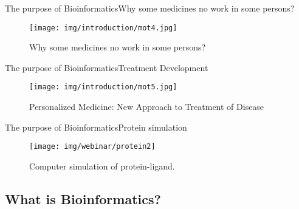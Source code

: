 \documentclass[10pt]{beamer}
\newcommand{\1}{
        	\setbeamertemplate{background}{
        		\texttt{[image: img/1]}
        		\tikz[overlay] \fill[fill opacity=0.75,fill=white] (0,0) rectangle (-\paperwidth,\paperheight);
        	}
}
\begin{document}
\begin{frame}{The purpose of Bioinformatics}{Why some medicines no work in some persons?}
	\begin{figure}[]
		\centering
		\texttt{[image: img/introduction/mot4.jpg]}
		\label{img:mot2}
		\caption{Why some medicines no work in some persons?}
	\end{figure}
\end{frame}

\begin{frame}{The purpose of Bioinformatics}{Treatment Development}
	\begin{figure}[]
		\centering
		\texttt{[image: img/introduction/mot5.jpg]}
		\label{img:mot2}
		\caption{Personalized Medicine: New Approach to Treatment of Disease}
	\end{figure}
\end{frame}

\begin{frame}{The purpose of Bioinformatics}{Protein simulation}
	\begin{figure}[]
		\centering
		\texttt{[image: img/webinar/protein2]}
		\label{img:mot2}
		\caption{Computer simulation of protein-ligand.}
	\end{figure}
\end{frame}



\subsection{What is Bioinformatics?}
\end{document}

